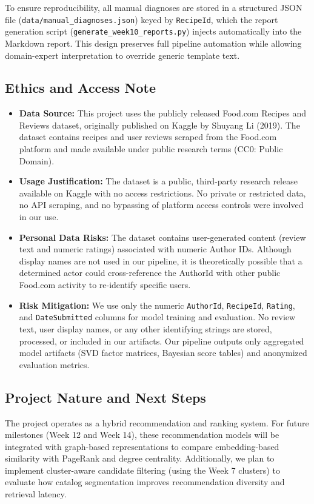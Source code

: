 \documentclass[11pt,a4paper]{article}
\begin{document}
To ensure reproducibility, all manual diagnoses are stored in a structured JSON file (\texttt{data/manual\_diagnoses.json}) keyed by \texttt{RecipeId}, which the report generation script (\texttt{generate\_week10\_reports.py}) injects automatically into the Markdown report. This design preserves full pipeline automation while allowing domain-expert interpretation to override generic template text.

\subsection{Ethics and Access Note}
\begin{itemize}
    \item \textbf{Data Source:} This project uses the publicly released Food.com Recipes and Reviews dataset, originally published on Kaggle by Shuyang Li (2019). The dataset contains recipes and user reviews scraped from the Food.com platform and made available under public research terms (CC0: Public Domain).
    \item \textbf{Usage Justification:} The dataset is a public, third-party research release available on Kaggle with no access restrictions. No private or restricted data, no API scraping, and no bypassing of platform access controls were involved in our use.
    \item \textbf{Personal Data Risks:} The dataset contains user-generated content (review text and numeric ratings) associated with numeric Author IDs. Although display names are not used in our pipeline, it is theoretically possible that a determined actor could cross-reference the AuthorId with other public Food.com activity to re-identify specific users.
    \item \textbf{Risk Mitigation:} We use only the numeric \texttt{AuthorId}, \texttt{RecipeId}, \texttt{Rating}, and \texttt{DateSubmitted} columns for model training and evaluation. No review text, user display names, or any other identifying strings are stored, processed, or included in our artifacts. Our pipeline outputs only aggregated model artifacts (SVD factor matrices, Bayesian score tables) and anonymized evaluation metrics.
\end{itemize}

\subsection{Project Nature and Next Steps}
The project operates as a hybrid recommendation and ranking system. 
For future milestones (Week 12 and Week 14), these recommendation models will be integrated with graph-based representations to compare embedding-based similarity with PageRank and degree centrality.
Additionally, we plan to implement cluster-aware candidate filtering (using the Week 7 clusters) to evaluate how catalog segmentation improves recommendation diversity and retrieval latency.
\end{document}

